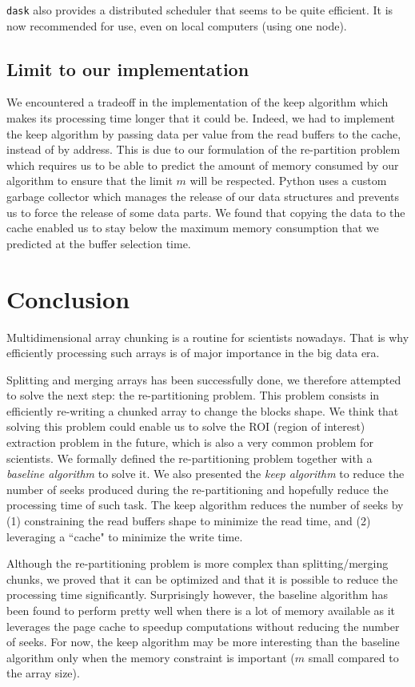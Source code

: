 \documentclass[sigconf, nonacm]{acmart}
\begin{document}
\texttt{dask} also provides a distributed scheduler that seems to be quite
efficient.
It is now recommended for use, even on local computers (using one node).

\subsection{Limit to our implementation}
We encountered a tradeoff in the implementation of the keep algorithm which
makes its processing time longer that it could be.
Indeed, we had to implement the keep algorithm by passing data per value from
the read buffers to the cache, instead of by address.
This is due to our formulation of the re-partition problem which requires us to
be able to predict the amount of memory consumed by our algorithm to ensure that
the limit $m$ will be respected.
Python uses a custom garbage collector which manages the release of our
data structures and prevents us to force the release of some data parts.
We found that copying the data to the cache enabled us to stay below the
maximum memory consumption that we predicted at the buffer selection time.


\section{Conclusion}

Multidimensional array chunking is a routine for scientists nowadays.
That is why efficiently processing such arrays is of major importance in the big data era.

Splitting and merging arrays has been successfully done, we therefore attempted
to solve the next step: the re-partitioning problem.
This problem consists in efficiently re-writing a chunked array to change the blocks shape.
We think that solving this problem could enable us to solve the ROI (region of interest)
extraction problem in the future, which is also a very common problem for scientists.
We formally defined the re-partitioning problem together with a \emph{baseline algorithm} to solve it.
We also presented the \emph{keep algorithm} to reduce the number of seeks produced during
the re-partitioning and hopefully reduce the processing time of such task.
The keep algorithm reduces the number of seeks by
(1) constraining the read buffers shape to minimize the read time, and
(2) leveraging a ``cache" to minimize the write time.

Although the re-partitioning problem is more complex than splitting/merging chunks,
we proved that it can be optimized and that it is possible to reduce the
processing time significantly.
Surprisingly however, the baseline algorithm has been found to perform pretty
well when there is a lot of memory available as it leverages the page cache to
speedup computations without reducing the number of seeks.
For now, the keep algorithm may be more interesting than the baseline algorithm
only when the memory constraint is important ($m$ small compared to the array size).
\end{document}
